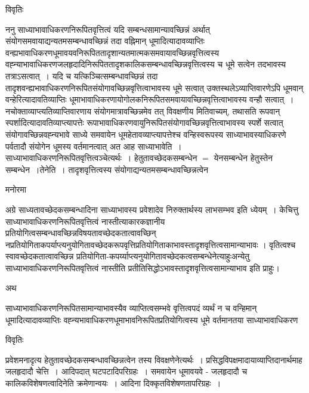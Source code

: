 \documentclass[10pt, openany]{book}
\begin{document}
{\begin{center}     विवृतिः \end{center}

ननु साध्याभावाधिकरणनिरूपितवृत्तित्वं यदि सम्बन्धसामान्यावच्छिन्नं अर्थात् संयोगसमवायाद्यन्यतमसम्बन्धावच्छिन्नं तदा वह्निमान् धूमादित्यादावव्याप्तिः वन्ह्यभावाधिकरणधूमावयवनिरूपिततादृशान्यतमात्मकसमवायावच्छिन्नवृत्तित्वस्य वह्न्याभावाधिकरणजलहृदादिनिरूपिततादृशकालिकसम्बन्धावच्छिन्नवृत्तित्वस्य च धूमे सत्वेन तदभावस्य तत्राऽसत्वात्~। यदि च यत्किञ्चित्सम्बन्धावच्छिन्नं तदा तादृशवन्ह्यभावाधिकरणनिरूपितसंयोगावच्छिन्नवृत्तित्वाभावस्य धूमे सत्वात् उक्तस्थलेऽव्याप्तिवारणेऽपि धूमवान् वन्हेरित्यादावतिव्याप्तिः धूमाभावाधिकरणायोगोलकनिरूपितसमवायावच्छिन्नवृत्तित्वाभावस्य वन्हौ सत्वात्~। नचोक्ताव्याप्त्यतिव्याप्तिवारणाय संयोगमात्रावच्छिन्नमेव तत् विवक्षणीय मितिवाच्यम्, तथासति रूपवान् स्पर्शादित्यादावतिव्याप्त्यापत्तेः रूपाभावाधिकरणवायुनिरूपितसंयोगावच्छिन्नवृत्तित्वाभावस्य स्पर्शे सत्वात् संयोगावच्छिन्नवह्न्यभावे साध्ये समवायेन धूमहेतावव्याप्त्यापत्तेश्च वन्हिस्वरूपस्य साध्याभावस्याधिकरणे पर्वतादौ संयोगेन धूमस्य वर्तमानत्वात् अत आह {\la साध्याभावेति~।} साध्याभावाधिकरणनिरूपितवृत्तित्वञ्चेत्यर्थः~। हेतुतावच्छेदकसम्बन्धेन $=$ येनसम्बन्धेन हेतुस्तेन सम्बन्धेन~।{\la तेनेति~।} तादृशवृत्तित्वस्य संयोगाद्यन्यतमसम्बन्धावच्छिन्नत्वेन
\begin{center}   मनोरमा  \end{center}

अग्रे साध्यतावच्छेदकसम्बन्धादिना साध्याभावस्य प्रवेशादेव निरुक्तार्थस्य लाभसम्भव इति ध्येयम्~। केचित्तु साध्याभावाधिकरणनिरूपितवृत्तित्वं
नास्तीत्याकारकज्ञानीय प्रतियोगित्वसम्बन्धावच्छिन्नविषयतावच्छेदकतात्वावच्छिन् नप्रतियोगिताकपर्याप्त्यनुयोगितावच्छेदकरूपवृत्तिप्रतियोगिताकाभावस्तादृशवृत्तित्वसामान्याभावः । वृतित्वश्च स्वावच्छेदकतात्वावच्छिन्न प्रतियोगिता-कपर्य्याप्त्यनुयोगितावच्छेदकत्वसम्बन्धेनेत्याहुः\textendash  अन्येतु साध्याभावाधिकरणनिरूपितवृत्तित्वं नास्तीति
प्रतीतिसिद्धोऽभावस्तादृशवृत्तित्वसामान्याभाव इति प्राहुः।

 \noindent अथ\textendash
 
साध्याभावाधिकरणनिरूपितसामान्याभावस्यैव व्याप्तित्वसम्भवे वृत्तित्वपदं व्यर्थं न च वन्हिमान् धूमादित्यादावव्याप्तिः वह्न्यभावाधिकरणधूमाभावनिरूपितप्रतियोगित्वस्य धूमे वर्तमानतया साध्याभावाधिकरण
\newpage
\begin{center} विवृतिः \end{center}
प्रवेशमनादृत्य हेतुतावच्छेदकसम्बन्धावच्छिन्नत्वेन तस्य विवक्षणेनेत्यर्थः~। प्रसिद्धविपक्षमादायाव्याप्तिदानार्थमाह जलहृदादौ चेत्ति~। आदिपदात् घटपटादिपरिग्रहः~। समवायेन धूमावयवे - जलहृदादौ च कालिकविशेषणत्वादिनेति क्रमेणान्वयः~। आदिना दिक्कृतविशेषणतापरिग्रहः~।\\

}
\end{document}
